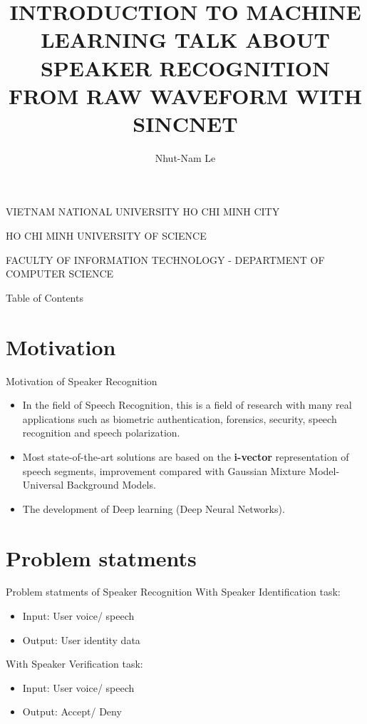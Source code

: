 \documentclass[notheorems, aspectratio=54]{beamer}
\author{Nhut-Nam Le}
\title{INTRODUCTION TO MACHINE LEARNING \newline TALK ABOUT SPEAKER RECOGNITION FROM \newline RAW WAVEFORM WITH SINCNET}
\institute{Department of Computer Science, University of Science, VNU}
\date[\today]{}
\begin{document}
\begin{frame}
	\centering
	VIETNAM NATIONAL UNIVERSITY HO CHI MINH CITY
	
	HO CHI MINH UNIVERSITY OF SCIENCE
	
	FACULTY OF INFORMATION TECHNOLOGY - DEPARTMENT OF COMPUTER SCIENCE
	\titlepage
\end{frame}

\begin{frame}{Table of Contents}
	\tableofcontents
\end{frame}

\section{Motivation}
\begin{frame}{Motivation of Speaker Recognition}
	\begin{itemize}
		\item In the field of Speech Recognition, this is a field of research with many real applications such as biometric authentication, forensics, security, speech recognition and speech polarization.
		\item Most state-of-the-art solutions are based on the \textbf{i-vector} representation of speech segments, improvement compared with Gaussian Mixture Model-Universal Background Models.
		\item The development of Deep learning (Deep Neural Networks).
	\end{itemize}
\end{frame}
\section{Problem statments}
\begin{frame}{Problem statments of Speaker Recognition}
	With Speaker Identification task:
	\begin{itemize}
		\item Input: User voice/ speech
		\item Output: User identity data
	\end{itemize}
	With Speaker Verification task:
	\begin{itemize}
		\item Input: User voice/ speech
		\item Output: Accept/ Deny
	\end{itemize}
\end{frame}
\end{document}
